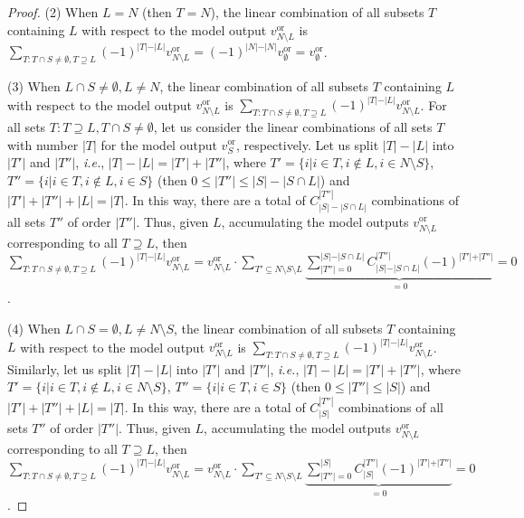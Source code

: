 \documentclass[10pt,twocolumn,letterpaper]{article}
\begin{document}
\begin{proof}
(2) When \( L=N \) (then \( T=N \)), the linear combination of all subsets \( T \) containing \( L \) with respect to the model output \( v^{\text{or}}_{N \setminus L} \) is \( \sum\nolimits_{T: T \cap S \neq \emptyset, T \supseteq L} (-1)^{\vert T \vert - \vert L \vert} v^{\text{or}}_{N \setminus L} = (-1)^{\vert N \vert - \vert N \vert} v^{\text{or}}_\emptyset = v^{\text{or}}_\emptyset \).

(3) When \( L \cap S \neq \emptyset, L \neq N \), the linear combination of all subsets \( T \) containing \( L \) with respect to the model output \( v^{\text{or}}_{N \setminus L} \) is \( \sum\nolimits_{T: T \cap S \neq \emptyset, T \supseteq L} (-1)^{\vert T \vert - \vert L \vert} v^{\text{or}}_{N \setminus L} \). For all sets \( T: T\supseteq L, T \cap S \neq \emptyset \), let us consider the linear combinations of all sets \( T \) with number \( |T| \) for the model output \( v^{\text{or}}_S \), respectively. Let us split \( |T| - |L| \) into \( |T'| \) and \( |T''| \), \textit{i.e.}, \( |T| - |L| = |T'| + |T''| \), where \( T'=\{i|i\in T, i\notin L, i\in N\setminus S\} \), \( T''=\{i|i\in T, i\notin L, i\in S\} \) (then \( 0\le|T''|\le|S|-|S\cap L| \)) and \( |T'| + |T''| + |L| = |T| \). In this way, there are a total of \( C_{|S|-|S\cap L|}^{|T''|} \) combinations of all sets \( T'' \) of order \( |T''| \). Thus, given \( L \), accumulating the model outputs \( v^{\text{or}}_{N\setminus L} \) corresponding to all \( T\supseteq L \), then \( \sum\nolimits_{T: T \cap S \neq \emptyset, T \supseteq L} (-1)^{\vert T \vert - \vert L \vert} v^{\text{or}}_{N \setminus L} = v^{\text{or}}_{N \setminus L} \cdot \sum_{T' \subseteq N\setminus S \setminus L} \underbrace{\sum\nolimits_{\vert T'' \vert = 0}^{\vert S \vert-\vert S \cap L \vert} C_{\vert S \vert - \vert S \cap L \vert}^{\vert T''\vert } (-1)^{\vert T' \vert + \vert T'' \vert} }_{=0} = 0 \).

(4) When \( L \cap S=\emptyset, L \neq N \setminus S \), the linear combination of all subsets \( T \) containing \( L \) with respect to the model output \( v^{\text{or}}_{N \setminus L} \) is \( \sum\nolimits_{T: T \cap S \neq \emptyset, T \supseteq L} (-1)^{\vert T \vert - \vert L \vert} v^{\text{or}}_{N \setminus L} \). Similarly, let us split \( |T| - |L| \) into \( |T'| \) and \( |T''| \), \textit{i.e.}, \( |T| - |L| = |T'| + |T''| \), where \( T'=\{i|i\in T, i\notin L, i\in N\setminus S\} \), \( T''=\{i|i\in T, i\in S\} \) (then \( 0\le|T''|\le|S| \)) and \( |T'| + |T''| + |L| = |T| \). In this way, there are a total of \( C_{|S|}^{|T''|} \) combinations of all sets \( T'' \) of order \( |T''| \). Thus, given \( L \), accumulating the model outputs \( v^{\text{or}}_{N\setminus L} \) corresponding to all \( T\supseteq L \), then \( \sum\nolimits_{T: T \cap S \neq \emptyset, T \supseteq L} (-1)^{\vert T \vert - \vert L \vert} v^{\text{or}}_{N \setminus L} = v^{\text{or}}_{N \setminus L} \cdot \sum_{T' \subseteq N\setminus S \setminus L} \underbrace{\sum\nolimits_{\vert T'' \vert = 0}^{\vert S \vert} C_{\vert S \vert }^{\vert T''\vert } (-1)^{\vert T' \vert + \vert T'' \vert} }_{=0} = 0 \).


\end{proof}
\end{document}
